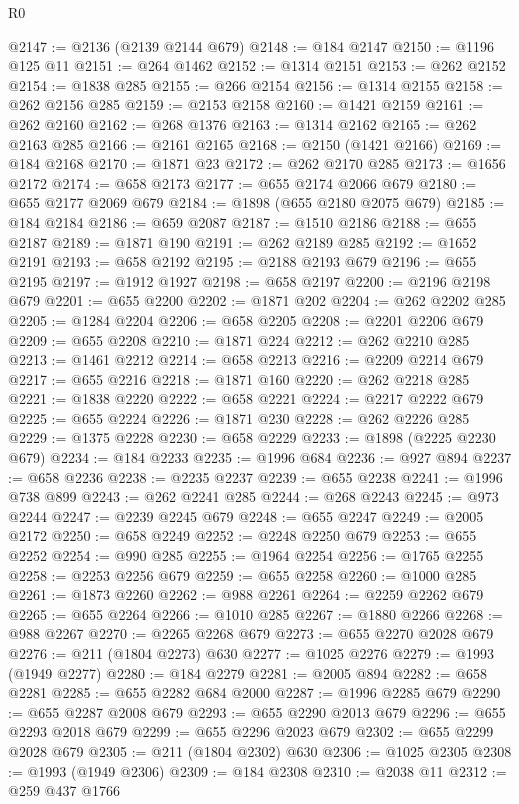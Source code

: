 \begin{lexlean}{R0}
\begin{coremodule}
@2147 := @2136 (@2139 @2144 @679)
@2148 := @184 @2147
@2150 := @1196 @125 @11
@2151 := @264 @1462
@2152 := @1314 @2151
@2153 := @262 @2152
@2154 := @1838 @285
@2155 := @266 @2154
@2156 := @1314 @2155
@2158 := @262 @2156 @285
@2159 := @2153 @2158
@2160 := @1421 @2159
@2161 := @262 @2160
@2162 := @268 @1376
@2163 := @1314 @2162
@2165 := @262 @2163 @285
@2166 := @2161 @2165
@2168 := @2150 (@1421 @2166)
@2169 := @184 @2168
@2170 := @1871 @23
@2172 := @262 @2170 @285
@2173 := @1656 @2172
@2174 := @658 @2173
@2177 := @655 @2174 @2066 @679
@2180 := @655 @2177 @2069 @679
@2184 := @1898 (@655 @2180 @2075 @679)
@2185 := @184 @2184
@2186 := @659 @2087
@2187 := @1510 @2186
@2188 := @655 @2187
@2189 := @1871 @190
@2191 := @262 @2189 @285
@2192 := @1652 @2191
@2193 := @658 @2192
@2195 := @2188 @2193 @679
@2196 := @655 @2195
@2197 := @1912 @1927
@2198 := @658 @2197
@2200 := @2196 @2198 @679
@2201 := @655 @2200
@2202 := @1871 @202
@2204 := @262 @2202 @285
@2205 := @1284 @2204
@2206 := @658 @2205
@2208 := @2201 @2206 @679
@2209 := @655 @2208
@2210 := @1871 @224
@2212 := @262 @2210 @285
@2213 := @1461 @2212
@2214 := @658 @2213
@2216 := @2209 @2214 @679
@2217 := @655 @2216
@2218 := @1871 @160
@2220 := @262 @2218 @285
@2221 := @1838 @2220
@2222 := @658 @2221
@2224 := @2217 @2222 @679
@2225 := @655 @2224
@2226 := @1871 @230
@2228 := @262 @2226 @285
@2229 := @1375 @2228
@2230 := @658 @2229
@2233 := @1898 (@2225 @2230 @679)
@2234 := @184 @2233
@2235 := @1996 @684
@2236 := @927 @894
@2237 := @658 @2236
@2238 := @2235 @2237
@2239 := @655 @2238
@2241 := @1996 @738 @899
@2243 := @262 @2241 @285
@2244 := @268 @2243
@2245 := @973 @2244
@2247 := @2239 @2245 @679
@2248 := @655 @2247
@2249 := @2005 @2172
@2250 := @658 @2249
@2252 := @2248 @2250 @679
@2253 := @655 @2252
@2254 := @990 @285
@2255 := @1964 @2254
@2256 := @1765 @2255
@2258 := @2253 @2256 @679
@2259 := @655 @2258
@2260 := @1000 @285
@2261 := @1873 @2260
@2262 := @988 @2261
@2264 := @2259 @2262 @679
@2265 := @655 @2264
@2266 := @1010 @285
@2267 := @1880 @2266
@2268 := @988 @2267
@2270 := @2265 @2268 @679
@2273 := @655 @2270 @2028 @679
@2276 := @211 (@1804 @2273) @630
@2277 := @1025 @2276
@2279 := @1993 (@1949 @2277)
@2280 := @184 @2279
@2281 := @2005 @894
@2282 := @658 @2281
@2285 := @655 @2282 @684 @2000
@2287 := @1996 @2285 @679
@2290 := @655 @2287 @2008 @679
@2293 := @655 @2290 @2013 @679
@2296 := @655 @2293 @2018 @679
@2299 := @655 @2296 @2023 @679
@2302 := @655 @2299 @2028 @679
@2305 := @211 (@1804 @2302) @630
@2306 := @1025 @2305
@2308 := @1993 (@1949 @2306)
@2309 := @184 @2308
@2310 := @2038 @11
@2312 := @259 @437 @1766

\end{coremodule}
\end{lexlean}
